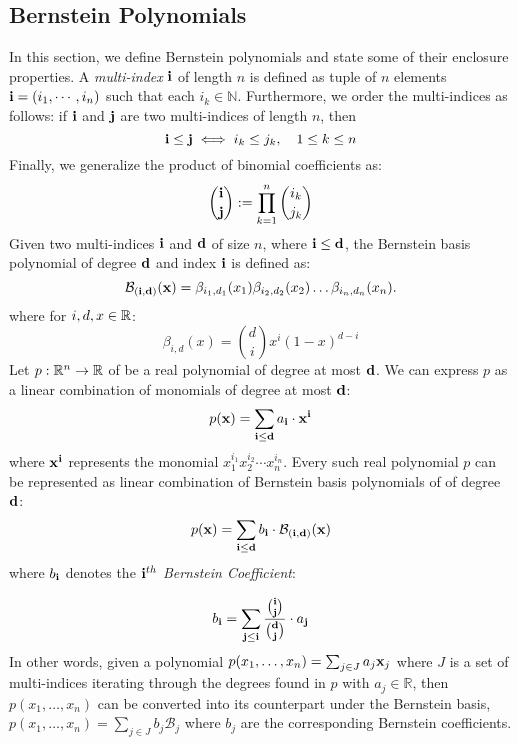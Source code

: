 \subsection{Bernstein Polynomials}
\label{sec:bernstein}
In this section, we define Bernstein polynomials and state some of their enclosure properties. A \emph{multi-index} ${\bf i}$ of length $n$ is defined as tuple of $n$ elements ${\bf i} = (i_1,\cdots, i_n)$ such that each $i_k \in \mathbb{N}$. Furthermore, we order the multi-indices as follows: if ${\bf i}$ and ${\bf j}$ are two multi-indices of length $n$, then
\[
  {\bf i} \leq {\bf j} \iff i_k \leq j_k, \quad 1 \leq  k \leq n
\]
Finally, we generalize the product of binomial coefficients as:
\[
  \binom{{\bf i}}{{\bf j}} := \prod_{k=1}^n \binom{i_k}{j_k}
\]
%
Given two multi-indices ${\bf i}$ and ${\bf d}$ of size $n$, where ${\bf i} \leq {\bf d}$, the Bernstein basis polynomial of degree ${\bf d}$ and index ${\bf i}$ is defined as:
\begin{equation}
\label{eq:bernstein_basis_poly}
\mathcal{B}_{({\bf i},{\bf d})}({\bf x}) = \beta_{i_1,d_1}(x_1) \beta_{i_2,d_2}(x_2)\ldots \beta_{i_n,d_n}(x_n).
\end{equation}
%
where for $i,d,x \in {\mathbb{R}}$:
%
\begin{equation}
\beta_{i,d}(x) = \binom{d}{i}x^{i}(1-x)^{d - i}
\end{equation}
%
Let $p: {\mathbb{R}}^n \rightarrow {\mathbb{R}}$ of be a real polynomial of degree at most ${\bf d}$. We can express $p$ as a linear combination of monomials of degree at most ${\bf d}$:
\[
p({\bf x}) = \sum_{{\bf i} \leq {\bf d}} a_{\bf i} \cdot {\bf x}^{\bf i}
\]
where ${\bf x}^{\bf i}$ represents the monomial $x_1^{i_1}x_2^{i_2}\cdots x_n^{i_n}$. Every such real polynomial $p$ can be represented as linear combination of Bernstein basis polynomials of of degree ${\bf d}$:
%
\begin{equation}
  p({\bf x}) = \sum_{{\bf i} \leq {\bf d}} b_{{\bf i}} \cdot \mathcal{B}_{({\bf i},{\bf d})}({\bf x})
\end{equation}
where $b_{\bf i}$ denotes the \emph{${\bf i}^{th}$ Bernstein Coefficient}:

\begin{equation}
b_{{\bf i}} = \sum_{{\bf j} \leq {\bf i}} \frac{\binom{{\bf i}}{{\bf j}}}{\binom{{\bf d}}{{\bf j}}}\cdot a_{{\bf j}}
\end{equation}
%
\noindent In other words, given a polynomial $p(x_1,\ldots,x_n) = \sum_{j \in J} a_j {\bf x}_{j}$ where $J$ is a set of multi-indices iterating through the degrees found in $p$ with $a_j \in \mathbb{R}$, then $p(x_1,\ldots,x_n)$ can be converted into its counterpart under the Bernstein basis, $p(x_1,\ldots,x_n) = \sum_{j \in J} b_j \mathcal{B}_j $ where $b_j$ are the corresponding Bernstein coefficients.


